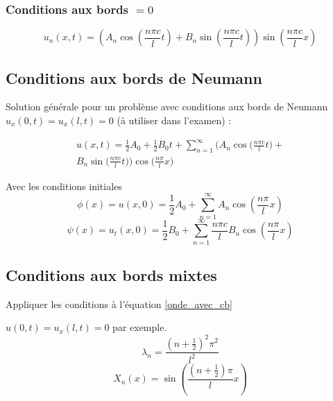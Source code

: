 \documentclass[resume]{subfiles}
\begin{document}
\subsubsection{Conditions aux bords $=0$}
\begin{scriptsize}
$$\boxed{u_n(x,t)=\left(A_n\cos\left(\frac{n\pi c}{l}t\right)+B_n\sin\left(\frac{n\pi c}{l}t\right)\right)\sin\left(\frac{n\pi c}{l}x\right)}$$
\end{scriptsize}
\subsection{Conditions aux bords de Neumann}
Solution générale pour un problème avec conditions aux bords de Neumann $u_x(0,t)=u_x(l,t)=0$ (à utiliser dans l'examen) :
\begin{mdframed}[linewidth=1pt,linecolor=black]
\begin{multline*}
u(x,t)=\frac{1}{2}A_0+\frac{1}{2}B_0t+\sum_{n=1}^{\infty}\Big(A_n\cos\Big(\frac{n\pi c}{l}t\Big)+\\ B_n\sin\Big(\frac{n\pi c}{l}t\Big)\Big)\cos\Big(\frac{n\pi}{l}x\Big)
\end{multline*}
\end{mdframed}
Avec les conditions initiales
$$\phi(x)=u(x,0)=\frac{1}{2}A_0+\sum_{n=1}^{\infty}A_n\cos\left(\frac{n\pi}{l}x\right)$$
$$\psi(x)=u_t(x,0)=\frac{1}{2}B_0+\sum_{n=1}^{\infty}\frac{n\pi c}{l}B_n\cos\left(\frac{n\pi}{l}x\right)$$
\subsection{Conditions aux bords mixtes}
Appliquer les conditions à l'équation \ref{onde_avec_cb}



$u(0,t)=u_x(l,t)=0$ par exemple.
$$\lambda_n=\frac{\left(n+\frac{1}{2}\right)^2\pi^2}{l^2}$$
$$X_n(x)=\sin\left(\frac{\left(n+\frac{1}{2}\right)\pi}{l}x\right)$$
\end{document}

